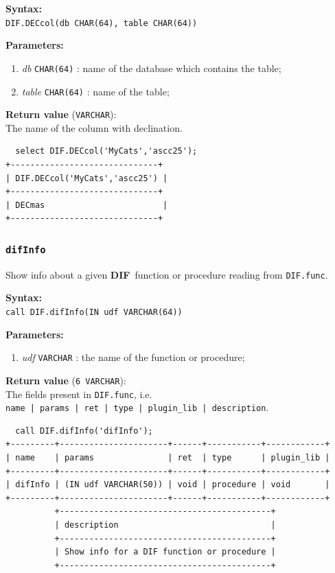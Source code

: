 \documentclass[10pt,titlepage]{article}
\newcommand{\dif}{\textbf{\small DIF}}
\newcommand{\syntax}[1]
{
  \bigskip
  \noindent
  \textbf{Syntax:} \\ 
  \indent \texttt{#1}
}
\newenvironment{parameters}
{
  \medskip
  \noindent
  \textbf{Parameters:}
  \begin{enumerate}
}
{
  \end{enumerate}
}
\newcommand{\param}[2]
{
  \item \textit{#1} \texttt{#2} 
}
\newcommand{\return}[1]
{
  \medskip
  \noindent
  \textbf{Return value} (\texttt{#1}): \\
  \indent
}
\newcommand{\example}
{
\medskip
\noindent{\textbf{Example:}}
}
\begin{document}
\syntax{DIF.DECcol(db CHAR(64), table CHAR(64))}

\begin{parameters}
  \param{db}{CHAR(64)}: name of the database which contains the table;
  \param{table}{CHAR(64)}: name of the table;
\end{parameters}

\return{VARCHAR} The name of the column with declination.

\example
%
\begin{verbatim}
  select DIF.DECcol('MyCats','ascc25');
+------------------------------+
| DIF.DECcol('MyCats','ascc25') |
+------------------------------+
| DECmas                        |
+------------------------------+
\end{verbatim}
%
%



\subsubsection{{\tt difInfo}}
Show info about a given \dif\ function or procedure reading from \texttt{DIF.func}.

\syntax{call DIF.difInfo(IN udf VARCHAR(64))}

\begin{parameters}
  \param{udf}{VARCHAR}: the name of the function or procedure;
\end{parameters}

\return{6 VARCHAR} The fields present in {\tt DIF.func}, i.e.
\\
\texttt{name | params | ret | type | plugin\_lib | description}.

\example
%
\begin{verbatim}
  call DIF.difInfo('difInfo');
+---------+----------------------+------+-----------+------------+
| name    | params               | ret  | type      | plugin_lib |
+---------+----------------------+------+-----------+------------+
| difInfo | (IN udf VARCHAR(50)) | void | procedure | void       |
+---------+----------------------+------+-----------+------------+
          +-------------------------------------------+
          | description                               |
          +-------------------------------------------+
          | Show info for a DIF function or procedure |
          +-------------------------------------------+
\end{verbatim}
%
%
\end{document}
